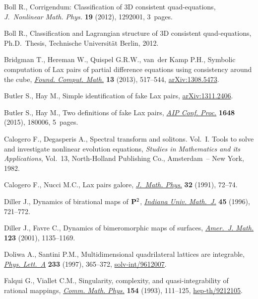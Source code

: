\documentclass[pdftex]{sigma}
\numberwithin{equation}{section}
\begin{document}
\begin{thebibliography}{99}
Boll R., Corrigendum: {C}lassif\/ication of 3{D} consistent quad-equations,
\textit{J.~Nonlinear Math. Phys.} \textbf{19} (2012), 1292001, 3~pages.

Boll R., Classif\/ication and {L}agrangian structure of {3D} consistent
 quad-equations, Ph.D.~Thesis, Technische Universit\"at Berlin, 2012.

Bridgman T., Hereman W., Quispel G.R.W., van~der Kamp P.H., Symbolic
 computation of {L}ax pairs of partial dif\/ference equations using consistency
 around the cube, \href{https://doi.org/10.1007/s10208-012-9133-9}{\textit{Found. Comput. Math.}} \textbf{13} (2013), 517--544,
 \href{https://arxiv.org/abs/1308.5473}{arXiv:1308.5473}.

Butler S., Hay M., Simple identif\/ication of fake {L}ax pairs,
 \href{https://arxiv.org/abs/1311.2406}{arXiv:1311.2406}.

Butler S., Hay M., Two def\/initions of fake {L}ax pairs, \href{https://doi.org/10.1063/1.4912469}{\textit{AIP Conf.
 Proc.}} \textbf{1648} (2015), 180006, 5~pages.

Calogero F., Degasperis A., Spectral transform and solitons. {V}ol.~{I}. Tools
 to solve and investigate nonlinear evolution equations, \textit{Studies in
 Mathematics and its Applications}, Vol.~13, North-Holland Publishing Co.,
 Amsterdam~-- New York, 1982.

Calogero F., Nucci M.C., Lax pairs galore, \href{https://doi.org/10.1063/1.529096}{\textit{J.~Math. Phys.}} \textbf{32}
 (1991), 72--74.

Diller J., Dynamics of birational maps of {${\bf P}^2$}, \href{https://doi.org/10.1512/iumj.1996.45.1331}{\textit{Indiana Univ.
 Math.~J.}} \textbf{45} (1996), 721--772.

Diller J., Favre C., Dynamics of bimeromorphic maps of surfaces,
 \href{https://doi.org/10.1353/ajm.2001.0038}{\textit{Amer.~J. Math.}} \textbf{123} (2001), 1135--1169.

Doliwa A., Santini P.M., Multidimensional quadrilateral lattices are
 integrable, \href{https://doi.org/10.1016/S0375-9601(97)00456-8}{\textit{Phys. Lett.~A}} \textbf{233} (1997), 365--372,
 \href{https://arxiv.org/abs/solv-int/9612007}{solv-int/9612007}.

Falqui G., Viallet C.M., Singularity, complexity, and quasi-integrability of
 rational mappings, \href{https://doi.org/10.1007/BF02096835}{\textit{Comm. Math. Phys.}} \textbf{154} (1993), 111--125,
 \href{https://arxiv.org/abs/hep-th/9212105}{hep-th/9212105}.


\end{thebibliography}
\end{document}
